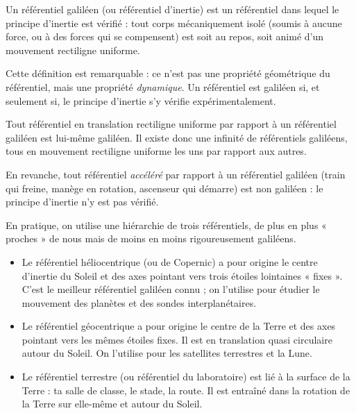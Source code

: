 \documentclass[11pt]{article}
\newcommand{\cle}[1]{{\popxbold\color{popdark}#1}}
\newcounter{popsec}
\newcounter{popsub}
\newcommand{\courssub}[1]{%
  \stepcounter{popsub}%
  \par\vspace{9pt}\noindent{\popxbold\fontsize{11.5}{13}\selectfont\color{popink}{\color{poporange}\thepopsec.\thepopsub}\hspace{6pt}#1}\par\nopagebreak\vspace{4pt}
}
\begin{document}
\begin{definition}
Un \cle{référentiel galiléen} (ou référentiel d'inertie) est un référentiel dans lequel le \cle{principe d'inertie} est vérifié : tout corps mécaniquement isolé (soumis à aucune force, ou à des forces qui se compensent) est soit au repos, soit animé d'un mouvement rectiligne uniforme.
\end{definition}

Cette définition est remarquable : ce n'est pas une propriété géométrique du référentiel, mais une propriété \emph{dynamique}. Un référentiel est galiléen si, et seulement si, le principe d'inertie s'y vérifie expérimentalement.

\begin{propriete}
Tout référentiel en translation rectiligne uniforme par rapport à un référentiel galiléen est lui-même galiléen. Il existe donc une infinité de référentiels galiléens, tous en mouvement rectiligne uniforme les uns par rapport aux autres.
\end{propriete}

En revanche, tout référentiel \emph{accéléré} par rapport à un référentiel galiléen (train qui freine, manège en rotation, ascenseur qui démarre) est \cle{non galiléen} : le principe d'inertie n'y est pas vérifié.

\courssub{Les trois référentiels usuels}

En pratique, on utilise une hiérarchie de trois référentiels, de plus en plus « proches » de nous mais de moins en moins rigoureusement galiléens.

\begin{definition}
\begin{itemize}
\item Le \cle{référentiel héliocentrique} (ou de Copernic) a pour origine le centre d'inertie du Soleil et des axes pointant vers trois étoiles lointaines « fixes ». C'est le meilleur référentiel galiléen connu ; on l'utilise pour étudier le mouvement des planètes et des sondes interplanétaires.
\item Le \cle{référentiel géocentrique} a pour origine le centre de la Terre et des axes pointant vers les mêmes étoiles fixes. Il est en translation quasi circulaire autour du Soleil. On l'utilise pour les satellites terrestres et la Lune.
\item Le \cle{référentiel terrestre} (ou référentiel du laboratoire) est lié à la surface de la Terre : ta salle de classe, le stade, la route. Il est entraîné dans la rotation de la Terre sur elle-même et autour du Soleil.
\end{itemize}
\end{definition}
\end{document}
